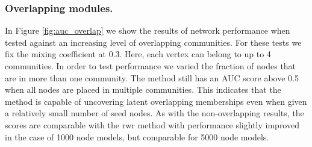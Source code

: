 \documentclass[sigconf]{acmart}
\begin{document}
\subsubsection{Overlapping modules.} 
In Figure \ref{fig:auc_overlap} we show the results of network performance when tested against an increasing level of overlapping communities.
For these tests we fix the mixing coefficient at $0.3$.
Here, each vertex can belong to up to 4 communities.
In order to test performance we varied the fraction of nodes that are in more than one community.
The method still has an AUC score above 0.5 when all nodes are placed in multiple communities.
This indicates that the method is capable of uncovering latent overlapping memberships even when given a relatively small number of seed nodes.
As with the non-overlapping results, the scores are comparable with the rwr method with performance slightly improved in the case of 1000 node models, but comparable for 5000 node models.
\end{document}
